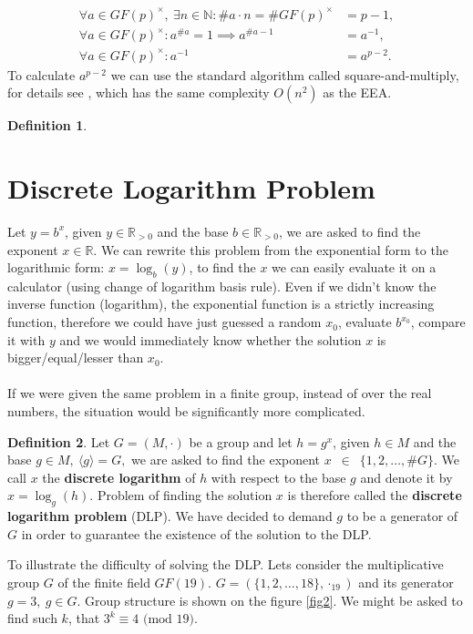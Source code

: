 \documentclass[thesis=M,english]{FITthesis}[2012/10/20]
\theoremstyle{remark}
\theoremstyle{definition}
\newtheorem{DF}{Definition}[section]
\begin{document}
\begin{align*}
\forall a \in GF(p)^{\times},\ \exists n \in \mathbb{N}: \#a \cdot n = \#GF(p)^{\times} &= p - 1, \\ 
\forall a \in GF(p)^{\times}: a^{\#a} = 1 \implies a^{\#a - 1} &= a^{-1}, \\
\forall a \in GF(p)^{\times}: a^{-1} &= a^{p-2}.
\end{align*}
To calculate $a^{p-2}$ we can use the standard algorithm called square-and-multiply, for details see \cite{mky}, which has the same complexity $O(n^2)$ as the EEA.
\begin{DF}

\end{DF}
\section{Discrete Logarithm Problem}
Let $y = b^x$, given $y \in \mathbb{R}_{> 0}$ and the base $b \in \mathbb{R}_{>0}$, we are asked to find the exponent $x \in \mathbb{R}$. We can rewrite this problem from the exponential form to the logarithmic form: $x = \log_b(y)$, to find the $x$ we can easily evaluate it on a calculator (using change of logarithm basis rule). Even if we didn't know the inverse function (logarithm), the exponential function is a strictly increasing function, therefore we could have just guessed a random $x_0$, evaluate $b^{x_0}$, compare it with $y$ and we would immediately know whether the solution $x$ is bigger/equal/lesser than $x_0$.
\\
\\
\noindent If we were given the same problem in a finite group, instead of over the real numbers, the situation would be significantly more complicated.
\begin{DF}
Let $G = (M, \cdot)$ be a group and let $h = g^x$, given $h \in M$ and the base $g \in M,\ \langle g \rangle = G,$ we are asked to find the exponent $x$~$\in$~$\{1, 2, \ldots, \#G\}.$ We call $x$ the \textbf{discrete logarithm} of $h$ with respect to the base $g$ and denote it by $x= \log_g(h)$. Problem of finding the solution $x$ is therefore called the \textbf{discrete logarithm problem} (DLP). We have decided to demand $g$ to be a generator of $G$ in order to guarantee the existence of the solution to the DLP.  
\end{DF}
\noindent To illustrate the difficulty of solving the DLP. Lets consider the multiplicative group $G$ of the finite field $GF(19).$ $G = (\{1,2,\ldots,18\}, \cdot_{19})$ and its generator $g=3,\ g \in G$. Group structure is shown on the figure \ref{fig2}. We might be asked to find such $k$, that $3^k \equiv 4 \text{ (mod 19)}$. 
\end{document}
